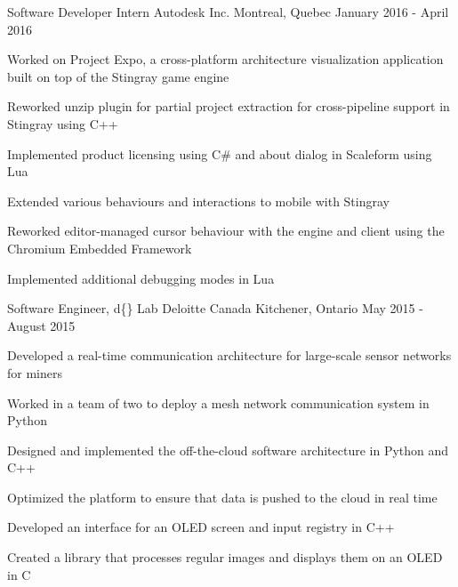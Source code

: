 


\begin{cventries}


\cventry
{Software Developer Intern}
{Autodesk Inc.}
{Montreal, Quebec}
{January 2016 - April 2016}
{ %
Worked on Project Expo, a cross-platform architecture visualization application built on top of the Stingray game engine
\begin{cvitems}
\item[]
\item {Reworked unzip plugin for partial project extraction for cross-pipeline support in Stingray using C++}
\item {Implemented product licensing using C\# and about dialog in Scaleform using Lua}
\item {Extended various behaviours and interactions to mobile with Stingray}
\item {Reworked editor-managed cursor behaviour with the engine and client using the Chromium Embedded Framework}
\item {Implemented additional debugging modes in Lua}
\end{cvitems}
}


\cventry
{Software Engineer, d\{\} Lab}
{Deloitte Canada} %
{Kitchener, Ontario} %
{May 2015 - August 2015} %
{
Developed a real-time communication architecture for large-scale sensor networks for miners
\begin{cvitems}
\item[]
\item {Worked in a team of two to deploy a mesh network communication system in Python}
\item {Designed and implemented the off-the-cloud software architecture in Python and C++}
\item {Optimized the platform to ensure that data is pushed to the cloud in real time}
\item {Developed an interface for an OLED screen and input registry in C++}
\item {Created a library that processes regular images and displays them on an OLED in C}
\end{cvitems}
}


\end{cventries}
